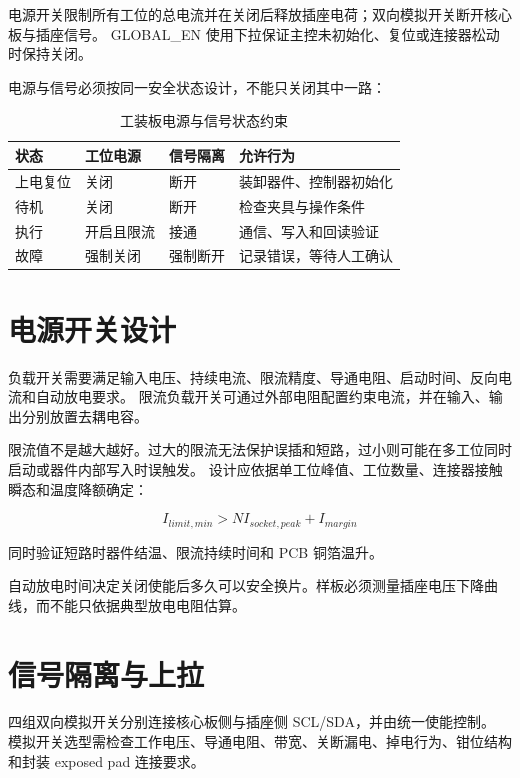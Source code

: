 电源开关限制所有工位的总电流并在关闭后释放插座电荷；双向模拟开关断开核心板与插座信号。
GLOBAL\_EN 使用下拉保证主控未初始化、复位或连接器松动时保持关闭。

电源与信号必须按同一安全状态设计，不能只关闭其中一路：

\begin{table}[htbp]
  \centering
  \caption{工装板电源与信号状态约束}
  \begin{tabular}{p{22mm}p{26mm}p{26mm}p{58mm}}
    \hline
    状态 & 工位电源 & 信号隔离 & 允许行为 \\
    \hline
    上电复位 & 关闭 & 断开 & 装卸器件、控制器初始化 \\
    待机 & 关闭 & 断开 & 检查夹具与操作条件 \\
    执行 & 开启且限流 & 接通 & 通信、写入和回读验证 \\
    故障 & 强制关闭 & 强制断开 & 记录错误，等待人工确认 \\
    \hline
  \end{tabular}
\end{table}

\section{电源开关设计}

负载开关需要满足输入电压、持续电流、限流精度、导通电阻、启动时间、反向电流和自动放电要求。
限流负载开关可通过外部电阻配置约束电流，并在输入、输出分别放置去耦电容。

限流值不是越大越好。过大的限流无法保护误插和短路，过小则可能在多工位同时启动或器件内部写入时误触发。
设计应依据单工位峰值、工位数量、连接器接触瞬态和温度降额确定：

\begin{equation}
  I_{limit,min} > N I_{socket,peak} + I_{margin}
\end{equation}

同时验证短路时器件结温、限流持续时间和 PCB 铜箔温升。

自动放电时间决定关闭使能后多久可以安全换片。样板必须测量插座电压下降曲线，而不能只依据典型放电电阻估算。

\section{信号隔离与上拉}

四组双向模拟开关分别连接核心板侧与插座侧 SCL/SDA，并由统一使能控制。
模拟开关选型需检查工作电压、导通电阻、带宽、关断漏电、掉电行为、钳位结构和封装 exposed pad 连接要求。

